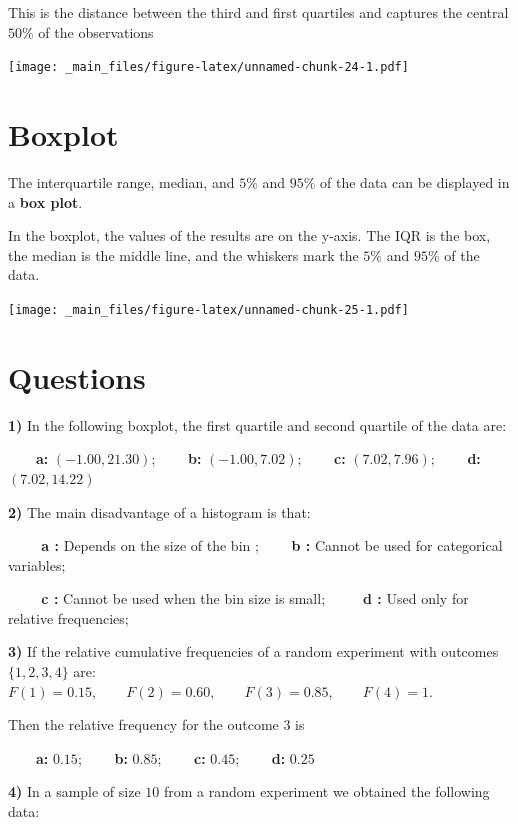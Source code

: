 \documentclass[
]{book}
\begin{document}
This is the distance between the third and first quartiles and captures the central \(50\%\) of the observations

\texttt{[image: \_main\_files/figure-latex/unnamed-chunk-24-1.pdf]}

\hypertarget{boxplot}{%
\section{Boxplot}\label{boxplot}}

The interquartile range, median, and \(5\%\) and \(95\%\) of the data can be displayed in a \textbf{box plot}.

In the boxplot, the values of the results are on the y-axis. The IQR is the box, the median is the middle line, and the whiskers mark the \(5\%\) and \(95\%\) of the data.

\texttt{[image: \_main\_files/figure-latex/unnamed-chunk-25-1.pdf]}

\hypertarget{questions}{%
\section{Questions}\label{questions}}

\textbf{1)} In the following boxplot, the first quartile and second quartile of the data are:

\textbf{\(\qquad\)a:} \((-1.00, 21.30)\); \textbf{\(\qquad\)b:} \((-1.00, 7.02)\); \textbf{\(\qquad\)c:} \((7.02, 7.96)\); \textbf{\(\qquad\)d:} \((7.02, 14.22)\)

\textbf{2)} The main disadvantage of a histogram is that:

\textbf{\(\qquad\) a :} Depends on the size of the bin ; \textbf{\(\qquad\)b :} Cannot be used for categorical variables;

\textbf{\(\qquad\) c :} Cannot be used when the bin size is small;
\textbf{\(\qquad\) d :} Used only for relative frequencies;

\textbf{3)} If the relative cumulative frequencies of a random experiment with outcomes \(\{1,2,3,4\}\) are: \(F(1)=0.15, \qquad F(2)=0.60, \qquad F(3)=0.85, \qquad F(4)=1\).

Then the relative frequency for the outcome \(3\) is

\textbf{\(\qquad\)a:} \(0.15\); \textbf{\(\qquad\)b:} \(0.85\); \textbf{\(\qquad\)c:} \(0.45\); \textbf{\(\qquad\)d:} \(0.25\)

\textbf{4)} In a sample of size \(10\) from a random experiment we obtained the following data:
\end{document}
